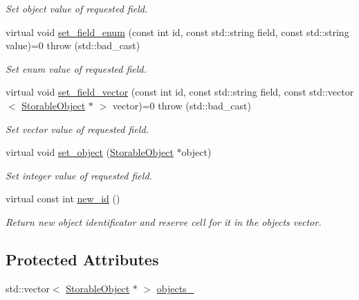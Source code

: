 \begin{DoxyCompactItemize}
\begin{DoxyCompactList}\small\item\em Set object value of requested field. \item\end{DoxyCompactList}\item 
virtual void \hyperlink{classStorage_1_1AbstractStorage_a50925678c74c09acd8549a541fdbbe9f}{set\_\-field\_\-enum} (const int id, const std::string field, const std::string value)=0  throw (std::bad\_\-cast)
\begin{DoxyCompactList}\small\item\em Set enum value of requested field. \item\end{DoxyCompactList}\item 
virtual void \hyperlink{classStorage_1_1AbstractStorage_a24af03b9a68ace199b0a6fa812abad39}{set\_\-field\_\-vector} (const int id, const std::string field, const std::vector$<$ \hyperlink{classStorage_1_1StorableObject}{StorableObject} $\ast$ $>$ vector)=0  throw (std::bad\_\-cast)
\begin{DoxyCompactList}\small\item\em Set vector value of requested field. \item\end{DoxyCompactList}\item 
virtual void \hyperlink{classStorage_1_1AbstractStorage_a641a6b75fe34c51943902d846ff66328}{set\_\-object} (\hyperlink{classStorage_1_1StorableObject}{StorableObject} $\ast$object)
\begin{DoxyCompactList}\small\item\em Set integer value of requested field. \item\end{DoxyCompactList}\item 
virtual const int \hyperlink{classStorage_1_1AbstractStorage_ab9e323067a58b74a7d1c835f0d1832c8}{new\_\-id} ()
\begin{DoxyCompactList}\small\item\em Return new object identificator and reserve cell for it in the objects vector. \item\end{DoxyCompactList}\end{DoxyCompactItemize}
\subsection*{Protected Attributes}
\begin{DoxyCompactItemize}
\item 
std::vector$<$ \hyperlink{classStorage_1_1StorableObject}{StorableObject} $\ast$ $>$ \hyperlink{classStorage_1_1AbstractStorage_a54758736009f559baf85a2d477b4d370}{objects\_\-}
\end{DoxyCompactItemize}
